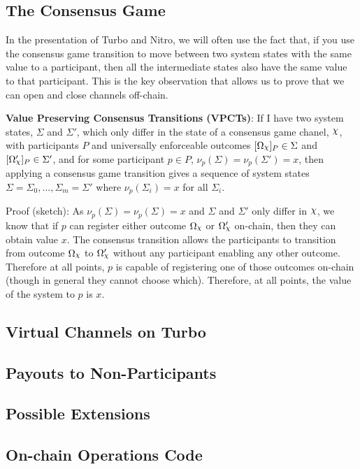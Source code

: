\documentclass{article}
\begin{document}
\subsection{The Consensus Game}

In the presentation of Turbo and Nitro, we will often use the fact that, if you use the
consensus game transition to move between two system states with the same value to a
participant, then all the intermediate states also have the same value to that participant.
This is the key observation that allows us to prove that we can open and close channels
off-chain.

\textbf{Value Preserving Consensus Transitions (VPCTs)}:
If I have two system states, $\Sigma$ and $\Sigma'$, which only differ in the state of
a consensus game chanel, $\rchi$, with participants $P$ and universally enforceable outcomes
$\enf{\Omega_\rchi}_P \in \Sigma$ and $\enf{\Omega'_\rchi}_P \in \Sigma'$, and 
for some participant $p \in P$, $\nu_p(\Sigma) = \nu_p(\Sigma') = x$, then
applying a consensus game transition gives a sequence of system states 
$\Sigma = \Sigma_0, \dots, \Sigma_m = \Sigma'$ where $\nu_p(\Sigma_i) = x$ for all $\Sigma_i$.

Proof (sketch): As $\nu_p(\Sigma) = \nu_p(\Sigma) = x$ and $\Sigma$ and $\Sigma'$ only differ
in $\rchi$, we know that if $p$ can register either outcome $\Omega_\rchi$ or $\Omega'_\rchi$ on-chain, then
they can obtain value $x$. The consensus transition allows the participants to transition
from outcome $\Omega_\rchi$ to $\Omega'_\rchi$ without any participant enabling any other outcome.
Therefore at all points, $p$ is capable of registering one of those outcomes on-chain (though
in general they cannot choose which).
Therefore, at all points, the value of the system to $p$ is $x$.

\subsection{Virtual Channels on Turbo}
\subsection{Payouts to Non-Participants}
\subsection{Possible Extensions}

\subsection{On-chain Operations Code}
\end{document}
